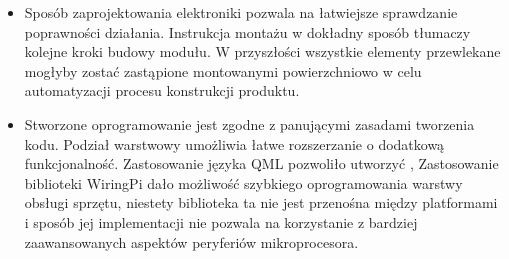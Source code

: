 \documentclass[12pt, eng, twoside, openany, final]{mgr}
\begin{document}
\begin{itemize}
\item Sposób zaprojektowania elektroniki pozwala na łatwiejsze sprawdzanie poprawności działania. Instrukcja montażu w dokładny sposób tłumaczy kolejne kroki budowy modułu. W przyszłości wszystkie elementy przewlekane mogłyby zostać zastąpione montowanymi powierzchniowo w celu automatyzacji procesu konstrukcji produktu.

\item Stworzone oprogramowanie jest zgodne z panującymi zasadami tworzenia kodu. Podział warstwowy umożliwia łatwe rozszerzanie o dodatkową funkcjonalność. Zastosowanie języka QML pozwoliło utworzyć , Zastosowanie biblioteki WiringPi dało możliwość szybkiego oprogramowania warstwy obsługi sprzętu, niestety biblioteka ta nie jest przenośna między platformami i sposób jej implementacji nie pozwala na korzystanie z bardziej zaawansowanych aspektów peryferiów mikroprocesora.

\end{itemize}
\thispagestyle{fancy}



\listoffigures
\listoftables


\end{document}
